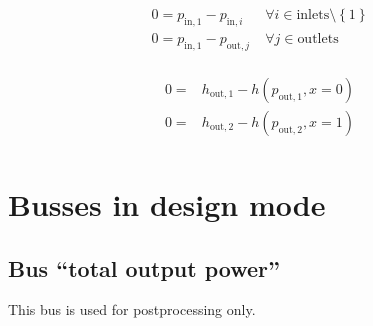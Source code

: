 \documentclass[]{article}
\begin{document}
\begin{equation}
\label{eq:Drum_pressure_constraints}
\begin{split}
0 = p_\mathrm{in,1} - p_{\mathrm{in,}i} & \; \forall i \in \text{inlets} \setminus \left\lbrace 1\right\rbrace\\
0 = p_\mathrm{in,1} - p_{\mathrm{out,}j} & \; \forall j \in \text{outlets}\\
\end{split}
\end{equation}

\begin{equation}
\label{eq:Drum_outlet_constraints}
\begin{split}
0 =&h_\mathrm{out,1} -h\left(p_\mathrm{out,1}, x=0\right)\\0 =&h_\mathrm{out,2} -h\left(p_\mathrm{out,2}, x=1\right)\\\end{split}
\end{equation}


\section{Busses in design mode}

\subsection{Bus ``total output power''}

This bus is used for postprocessing only.
\end{document}
